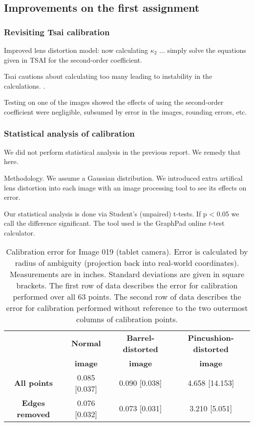 
\subsection{Improvements on the first assignment}
\label{sec:improvements}

\subsubsection{Revisiting Tsai calibration}

%

Improved lens distortion model: now calculating $\kappa_{2}$ ... simply solve the equations given in TSAI for the second-order coefficient.

Tsai cautions about calculating too many leading to instability in the calculations. \cite{TSAI}.

Testing on one of the images showed the effects of using the second-order coefficient were negligible, subsumed by error in the images, rounding errors, etc.

%

\subsubsection{Statistical analysis of calibration}

We did not perform statistical analysis in the previous report. We remedy that here.

Methodology. We assume a Gaussian distribution. We introduced extra artifical lens distortion into each image with an image processing tool to see its effects on error.

Our statistical analysis is done via Student's (unpaired) t-tests. If p < 0.05 we call the difference significant. The tool used is the GraphPad online $t$-test calculator. \cite{testcalc}

\begin{table}[h!]
  \centering
  \begin{tabular}{c c c c}
    \toprule
    \textbf{ } & \textbf{Normal} & \textbf{Barrel-distorted} & \textbf{Pincushion-distorted}\\
    \textbf{ } & \textbf{image} & \textbf{image} & \textbf{image}\\
    \midrule
    \textbf{All points} & 0.085 [0.037] & 0.090 [0.038] & 4.658 [14.153] \\
    \textbf{Edges removed} & 0.076 [0.032] & 0.073 [0.031] & 3.210 [5.051] \\
    \bottomrule
  \end{tabular}
  \caption[Calibration error for Image 019 (tablet camera)]{Calibration error for Image 019 (tablet camera). Error is calculated by radius of ambiguity (projection back into real-world coordinates). Measurements are in inches. Standard deviations are given in square brackets. The first row of data describes the error for calibration performed over all 63 points. The second row of data describes the error for calibration performed without reference to the two outermost columns of calibration points.}
  \label{tbl:stats090}
\end{table}

